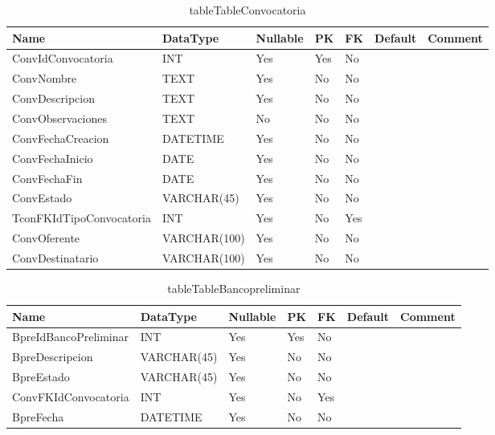 \begin{table}
	\caption{tableTableConvocatoria}
	\label{labelTableConvocatoria}
	\begin{tabular}{ |l|l|l|l|l|l|l| }
		\hline
		Name & DataType & Nullable & PK & FK & Default & Comment \\ \hline
		ConvIdConvocatoria & INT & Yes & Yes & No &  & \\ \hline 
		ConvNombre & TEXT & Yes & No & No &  & \\ \hline 
		ConvDescripcion & TEXT & Yes & No & No &  & \\ \hline 
		ConvObservaciones & TEXT & No & No & No &  & \\ \hline 
		ConvFechaCreacion & DATETIME & Yes & No & No &  & \\ \hline 
		ConvFechaInicio & DATE & Yes & No & No &  & \\ \hline 
		ConvFechaFin & DATE & Yes & No & No &  & \\ \hline 
		ConvEstado & VARCHAR(45) & Yes & No & No &  & \\ \hline 
		TconFKIdTipoConvocatoria & INT & Yes & No & Yes &  & \\ \hline 
		ConvOferente & VARCHAR(100) & Yes & No & No &  & \\ \hline 
		ConvDestinatario & VARCHAR(100) & Yes & No & No &  & \\ \hline 
		
	\end{tabular}
\end{table}


\begin{table}
	\caption{tableTableBancopreliminar}
	\label{labelTableBancopreliminar}
	\begin{tabular}{ |l|l|l|l|l|l|l| }
		\hline
		Name & DataType & Nullable & PK & FK & Default & Comment \\ \hline
		BpreIdBancoPreliminar & INT & Yes & Yes & No &  & \\ \hline 
		BpreDescripcion & VARCHAR(45) & Yes & No & No &  & \\ \hline 
		BpreEstado & VARCHAR(45) & Yes & No & No &  & \\ \hline 
		ConvFKIdConvocatoria & INT & Yes & No & Yes &  & \\ \hline 
		BpreFecha & DATETIME & Yes & No & No &  & \\ \hline 
		
	\end{tabular}
\end{table}


